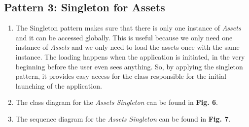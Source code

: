 \documentclass[a4paper,11pt]{article}
\begin{document}
\subsection{Pattern 3: Singleton for Assets}
\begin{enumerate}
\item The Singleton pattern makes sure that there is only one instance of \textit{Assets} and it can be accessed globally. This is useful because we only need one instance of \textit{Assets} and we only need to load the assets once with the same instance. The loading happens when the application is initiated, in the very beginning before the user even sees anything. So, by applying the singleton pattern, it provides easy access for the class responsible for the initial launching of the application.
\item The class diagram for the \textit{Assets Singleton} can be found in \textbf{Fig. 6}.
\begin{minipage}{\linewidth}
\end{minipage}
\item The sequence diagram for the \textit{Assets Singleton} can be found in \textbf{Fig. 7}.
\begin{minipage}{\linewidth}
\end{minipage}
\end{enumerate}
\end{document}
